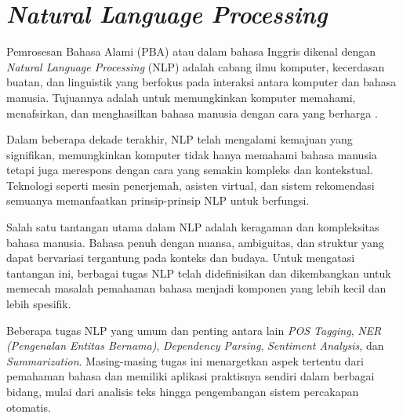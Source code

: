\section{\textit{Natural Language Processing}}

Pemrosesan Bahasa Alami (PBA) atau dalam bahasa Inggris dikenal dengan \textit{Natural Language Processing} (NLP) adalah cabang ilmu komputer, kecerdasan buatan, dan linguistik yang berfokus pada interaksi antara komputer dan bahasa manusia. Tujuannya adalah untuk memungkinkan komputer memahami, menafsirkan, dan menghasilkan bahasa manusia dengan cara yang berharga \parencite{nlp}.

Dalam beberapa dekade terakhir, NLP telah mengalami kemajuan yang signifikan, memungkinkan komputer tidak hanya memahami bahasa manusia tetapi juga merespons dengan cara yang semakin kompleks dan kontekstual. Teknologi seperti mesin penerjemah, asisten virtual, dan sistem rekomendasi semuanya memanfaatkan prinsip-prinsip NLP untuk berfungsi.

Salah satu tantangan utama dalam NLP adalah keragaman dan kompleksitas bahasa manusia. Bahasa penuh dengan nuansa, ambiguitas, dan struktur yang dapat bervariasi tergantung pada konteks dan budaya. Untuk mengatasi tantangan ini, berbagai tugas NLP telah didefinisikan dan dikembangkan untuk memecah masalah pemahaman bahasa menjadi komponen yang lebih kecil dan lebih spesifik.

Beberapa tugas NLP yang umum dan penting antara lain \textit{POS Tagging}, \textit{NER (Pengenalan Entitas Bernama)}, \textit{Dependency Parsing}, \textit{Sentiment Analysis}, dan \textit{Summarization}. Masing-masing tugas ini menargetkan aspek tertentu dari pemahaman bahasa dan memiliki aplikasi praktisnya sendiri dalam berbagai bidang, mulai dari analisis teks hingga pengembangan sistem percakapan otomatis.
